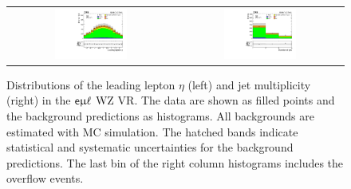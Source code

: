 \begin{figure}[tbh!]
 \begin{center}
 \begin{tabular}{cc}
 \includegraphics[width=0.45\textwidth]{figures/Part3/Selection/WZ/emul/lep1Eta}&
 \includegraphics[width=0.45\textwidth]{figures/Part3/Selection/WZ/emul/njet} \\
 \end{tabular}
 \caption{Distributions of the leading lepton $\eta$ (left) and jet multiplicity (right) in the $\textsf{e}\upmu\ell$ WZ VR. The data are shown as filled points and the background predictions as histograms. All backgrounds are estimated with \ac{MC} simulation. The hatched bands indicate statistical and systematic uncertainties for the background predictions. The last bin of the right column histograms includes the overflow events.}
 \label{fig:WZ_emul}
 \end{center}
\end{figure}

